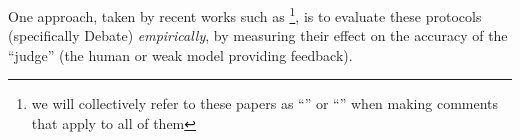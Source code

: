 	
	





One approach, taken by recent works such as \allpreviousworks\footnote{we will collectively refer to these papers as ``\previouswork{}'' or ``\previousworkalt{}'' when making comments that apply to all of them}, is to evaluate these protocols (specifically Debate) \emph{empirically}, by measuring their effect on the accuracy of the ``judge'' (the human or weak model providing feedback). %

